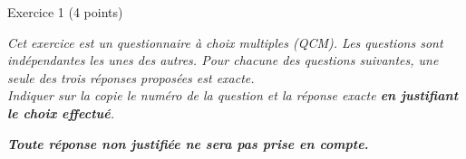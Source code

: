 
%
\begin{h2}Exercice 1 (4 points)\end{h2}
\par
\emph{Cet exercice est un questionnaire à choix multiples (QCM). Les questions sont indépendantes les unes des autres. Pour chacune des questions suivantes, une seule des trois réponses proposées est exacte.  \\Indiquer sur la copie le numéro de la question et la réponse exacte \textbf{en justifiant le choix effectué}. }
\par
\emph{\textbf{Toute réponse non justifiée ne sera pas prise en compte.}}
\par
